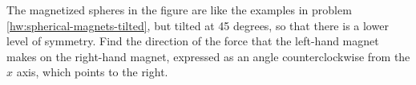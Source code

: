 The magnetized spheres in the figure are like the examples in
problem \ref{hw:spherical-magnets-tilted}, but tilted at
45 degrees, so that there is a lower level of symmetry.
Find the direction of the force that the left-hand magnet
makes on the right-hand magnet, expressed as an angle
counterclockwise from the $x$ axis, which points to the
right.\answercheck
